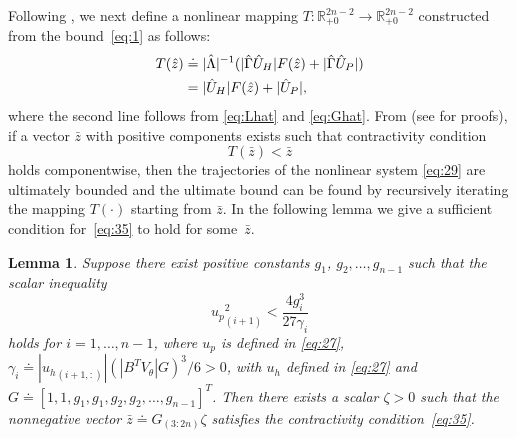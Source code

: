 \documentclass[letter, 10pt, conference]{ieeeconf}
\newtheorem{lemma}[theorem]{Lemma}
\newcommand{\R}{\mathbb{R}}
\newcommand{\1}{\mathbf{1}}
\newcommand{\0}{\mathbf{0}}
\begin{document}
{Following \cite{HaS13}, we next define a nonlinear mapping
$T:\R_{+0}^{2n-2}\rightarrow \R_{+0}^{2n-2}$ constructed from the
bound~\eqref{eq:1} as follows:
 \begin{align}
   \notag T(\hat{z}) &\doteq |\hat{\Lambda}|^{-1} (|\hat{\Gamma}
   \hat{U}_H| F(\hat{z}) + |\hat{\Gamma} \hat{U}_P|)
   \\
   \label{eq:38}
   &= |\hat{U}_H| F(\hat{z}) + |\hat{U}_P|,
  \end{align}
where the second line follows from \eqref{eq:Lhat} and \eqref{eq:Ghat}.
From \cite[Theorem~3]{HaS13} (see \cite{haimovich12:_bound-arxiv} for
proofs), if a vector $\bar{z}$ with positive components exists such
that contractivity condition
\begin{equation}
	\label{eq:35}
	T(\bar{z}) < \bar{z}
\end{equation}
holds componentwise, then the trajectories of the nonlinear system
\eqref{eq:29} are ultimately bounded and the ultimate bound can be
found by recursively iterating the mapping $T(\cdot)$ starting from
$\bar{z}$. In the following lemma we give a sufficient condition
for~\eqref{eq:35} to hold for some~$\bar{z}$.
 
\begin{lemma}
  \label{lem:contractivity}
  Suppose there exist positive constants $g_1$, $g_2,\dots,g_{n-1}$ such
  that the scalar inequality
  \begin{equation}
  	\label{eq:ContCond}
  	{u_p}_{(i+1)}^2 < \frac{4 g_i^3}{27 \gamma_i}
\end{equation}
  holds for $i=1,\dots,n-1$, where $u_p$ is defined in \eqref{eq:27},
  $\gamma_i \doteq |{u_h}_{(i+1,:)}|(|B^T V_\theta|G)^3/6 >0$, with
  $u_h$ defined in \eqref{eq:27} and $G \doteq
  [1,1,g_1,g_1,g_2,g_2,\dots,g_{n-1}]^T$. Then there exists a scalar
  $\zeta>0$ such that the nonnegative vector $\bar{z}\doteq G_{(3:2n)}
  \zeta $ satisfies the contractivity condition~\eqref{eq:35}.
\end{lemma}

}
\end{document}
